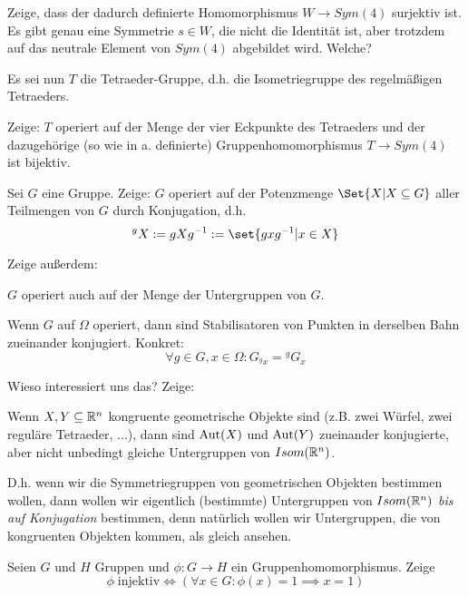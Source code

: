 \begin{sheet}
\begin{problem}[title={Gruppenhomomorphismen}]
\begin{subproblem}

Zeige, dass der dadurch definierte Homomorphismus $W\to Sym(4)$ surjektiv ist. Es gibt genau eine Symmetrie $s\in W$, die nicht die Identität ist, aber trotzdem auf das neutrale Element von $Sym(4)$ abgebildet wird. Welche?
\end{subproblem}

Es sei nun $T$ die Tetraeder-Gruppe, d.h. die Isometriegruppe des regelmäßigen Tetraeders. 
\begin{subproblem}
Zeige: $T$ operiert auf der Menge der vier Eckpunkte des Tetraeders und der dazugehörige (so wie in a. definierte) Gruppenhomomorphismus $T\to Sym(4)$ ist bijektiv.
\end{subproblem}
\end{problem}


\begin{problem}[title={Operation auf Teilmengen durch Konjugation}]
Sei $G$ eine Gruppe. Zeige: $G$ operiert auf der Potenzmenge $\Set{X | X\subseteq G}$ aller Teilmengen von $G$ durch Konjugation, d.h.
\[{^g X} := gXg^{-1} := \set{gxg^{-1} | x\in X}\]

Zeige außerdem:
\begin{subproblem}
$G$ operiert auch auf der Menge der Untergruppen von $G$.
\end{subproblem}
\begin{subproblem}
Wenn $G$ auf $\Omega$ operiert, dann sind Stabilisatoren von Punkten in derselben Bahn zueinander konjugiert. Konkret:
\[\forall g\in G, x\in\Omega: G_{^g x} = {^g G_x}\]
\end{subproblem}

Wieso interessiert uns das? Zeige:
\begin{subproblem}
Wenn $X,Y\subseteq\mathbb{R}^n$ kongruente geometrische Objekte sind (z.B. zwei Würfel, zwei reguläre Tetraeder, ...), dann sind $\operatorname{Aut}(X)$ und $\operatorname{Aut}(Y)$ zueinander konjugierte, aber nicht unbedingt gleiche Untergruppen von $Isom(\mathbb{R}^n)$.
\end{subproblem}
D.h. wenn wir die Symmetriegruppen von geometrischen Objekten bestimmen wollen, dann wollen wir eigentlich (bestimmte) Untergruppen von $Isom(\mathbb{R}^n)$ \emph{bis auf Konjugation} bestimmen, denn natürlich wollen wir Untergruppen, die von kongruenten Objekten kommen, als gleich ansehen.
\end{problem}


\begin{problem}[title={Injektiv = trivialer Kern}]
Seien $G$ und $H$ Gruppen und $\phi:G\to H$ ein Gruppenhomomorphismus. Zeige
\[\phi\;\text{injektiv} \iff (\forall x\in G: \phi(x)=1 \implies x=1)\]
\end{problem}


\end{sheet}
